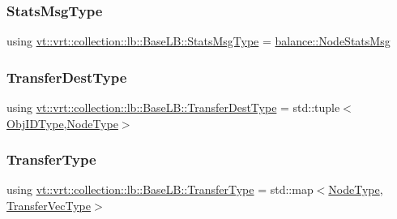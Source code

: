 \subsubsection{\texorpdfstring{Stats\+Msg\+Type}{StatsMsgType}}
{\footnotesize\ttfamily using \hyperlink{structvt_1_1vrt_1_1collection_1_1lb_1_1_base_l_b_a0cddaecd9e8450190585d0607a3439f1}{vt\+::vrt\+::collection\+::lb\+::\+Base\+L\+B\+::\+Stats\+Msg\+Type} =  \hyperlink{structvt_1_1vrt_1_1collection_1_1balance_1_1_node_stats_msg}{balance\+::\+Node\+Stats\+Msg}}

\mbox{\label{structvt_1_1vrt_1_1collection_1_1lb_1_1_base_l_b_add886785f64ea725005f1263fd1393be}} 
\subsubsection{\texorpdfstring{Transfer\+Dest\+Type}{TransferDestType}}
{\footnotesize\ttfamily using \hyperlink{structvt_1_1vrt_1_1collection_1_1lb_1_1_base_l_b_add886785f64ea725005f1263fd1393be}{vt\+::vrt\+::collection\+::lb\+::\+Base\+L\+B\+::\+Transfer\+Dest\+Type} =  std\+::tuple$<$\hyperlink{structvt_1_1vrt_1_1collection_1_1lb_1_1_base_l_b_a15a2f756b59c8c2437985206b32aa403}{Obj\+I\+D\+Type},\hyperlink{namespacevt_a866da9d0efc19c0a1ce79e9e492f47e2}{Node\+Type}$>$}

\mbox{\label{structvt_1_1vrt_1_1collection_1_1lb_1_1_base_l_b_a0a5f834082d85c558bdaf84c464c1ead}} 
\subsubsection{\texorpdfstring{Transfer\+Type}{TransferType}}
{\footnotesize\ttfamily using \hyperlink{structvt_1_1vrt_1_1collection_1_1lb_1_1_base_l_b_a0a5f834082d85c558bdaf84c464c1ead}{vt\+::vrt\+::collection\+::lb\+::\+Base\+L\+B\+::\+Transfer\+Type} =  std\+::map$<$\hyperlink{namespacevt_a866da9d0efc19c0a1ce79e9e492f47e2}{Node\+Type}, \hyperlink{structvt_1_1vrt_1_1collection_1_1lb_1_1_base_l_b_a329e8179ec41a1bd4924c79fe23a79af}{Transfer\+Vec\+Type}$>$}

